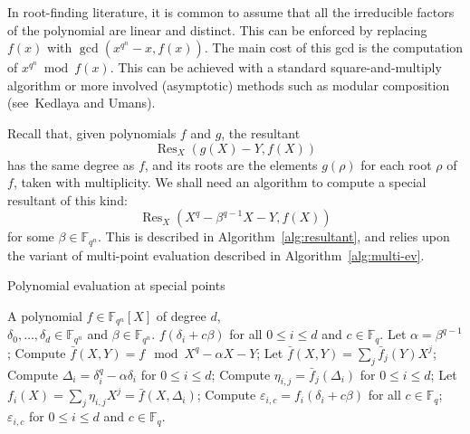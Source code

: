 \documentclass{sig-alternate}
\newcommand{\ff}[1]{\mathbb{F}_{#1}}
\newcommand{\dd}{d}
\newcommand{\qq}{q}
\newcommand{\nn}{n}
\newcommand{\qn}{{\qq^\nn}}
\newcommand{\basef}{\ff{\qq}}
\newcommand{\extf}{\ff{\qn}}
\newcommand{\bigO}{O}
\DeclareMathOperator{\Res}{Res}
\newcounter{algo}
\begin{document}
In root-finding literature, it is common to assume that all the irreducible factors of the polynomial are linear and distinct. This can be enforced by replacing $f(x)$ with $\gcd(x^\qn-x,f(x))$. The main cost of this gcd is the computation of $x^\qn\bmod f(x)$. This can be achieved with a standard square-and-multiply algorithm or more involved (asymptotic) methods such as modular composition (see~Kedlaya and Umans\cite{Kedlaya11}). 




Recall that, given polynomials $f$ and $g$, the resultant
$$\Res_X(g(X)-Y,f(X))$$
has the same degree as $f$, and its roots are the elements $g(\rho)$
for each root $\rho$ of $f$, taken with multiplicity. We shall need an
algorithm to compute a special resultant of this kind:
$$\Res_X(X^\qq-\beta^{\qq-1}X-Y,f(X))$$
for some $\beta\in\extf$. This is described in
Algorithm~\ref{alg:resultant}, and relies upon the variant of
multi-point evaluation described in Algorithm~\ref{alg:multi-ev}.



\begin{algorithm}
  \caption{Polynomial evaluation at special points}
  \label{alg:multi-ev}
  \begin{algorithmic}[1]
    \REQUIRE A polynomial $f\in\extf[X]$ of degree $\dd$,\\
    $\delta_0,\dots,\delta_\dd\in\extf$ and $\beta\in\extf$.
    \ENSURE $f(\delta_i+c\beta)$ for all $0\le i \le \dd$ and $c\in\basef$.
    \STATE Let $\alpha = \beta^{\qq-1}$;
    \STATE\label{alg:multi-ev:mod} Compute $\bar{f}(X,Y) = f \mod X^\qq-\alpha X-Y$;
    \STATE Let $\bar{f}(X,Y) = \sum_j \bar{f}_j(Y)X^j$;
    \STATE\label{alg:multi-ev:Delta} Compute $\Delta_i=\delta_i^\qq-\alpha\delta_i$ for $0\le i\le\dd$;
    \FOR {$0\le j<\qq$}
    \STATE\label{alg:multi-ev:multi-ev} Compute $\eta_{i,j}=\bar{f}_j(\Delta_i)$ for $0\le i\le\dd$;
    \ENDFOR
    \STATE Let $f_i(X) = \sum_j \eta_{i,j}X^j=\bar{f}(X,\Delta_i)$;
    \FOR {$0\le i \le\dd$}
    \STATE\label{alg:multi-ev:final-ev} Compute $\varepsilon_{i,c}=f_i(\delta_i+c\beta)$ for all $c\in\basef$;
    \ENDFOR
    \RETURN $\varepsilon_{i,c}$ for $0\le i\le\dd$ and $c\in\basef$.
  \end{algorithmic}
\end{algorithm}
\end{document}
